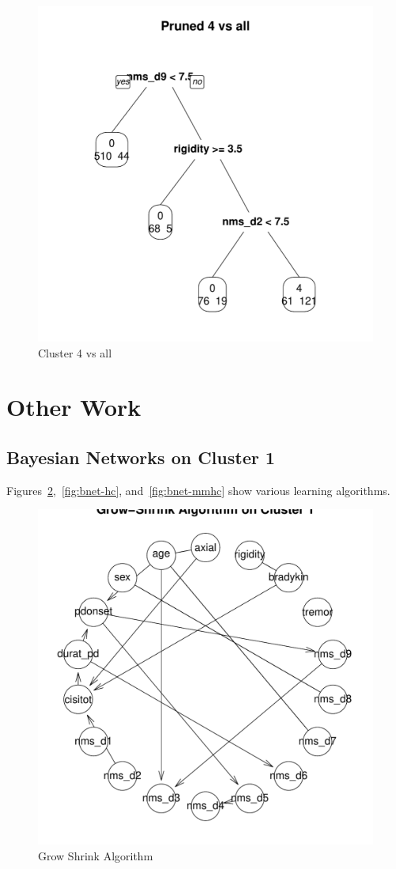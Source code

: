 \documentclass[letterpaper,12pt]{article}
\begin{document}
\begin{figure}[h]
  \centering
  \includegraphics[width=\linewidth]{dtree-4va-pruned.pdf}
  \caption{Cluster 4 vs all}
  \label{fig:4va}
\end{figure}
\section{Other Work}

\subsection{Bayesian Networks on Cluster 1}

Figures~\ref{fig:bnet-gs},~\ref{fig:bnet-hc}, and~\ref{fig:bnet-mmhc} show various
learning algorithms.

\begin{figure}[h]
  \centering
  \includegraphics[width=0.8\linewidth]{clus1-bnet-gs.pdf}
  \caption{Grow Shrink Algorithm}
  \label{fig:bnet-gs}
\end{figure}
\end{document}
